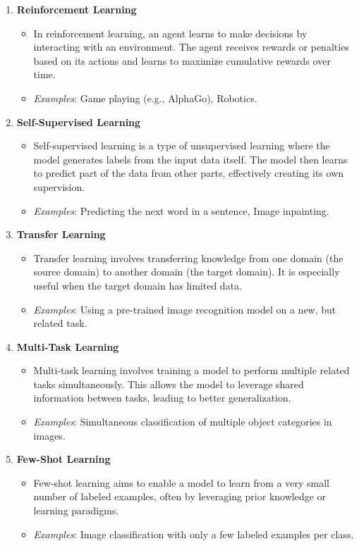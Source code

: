 \begin{enumerate}
    \item \textbf{Reinforcement Learning}
    \begin{itemize}
        \item In reinforcement learning, an agent learns to make decisions by interacting with an environment. The agent receives rewards or penalties based on its actions and learns to maximize cumulative rewards over time.
        \item \textit{Examples}: Game playing (e.g., AlphaGo), Robotics.
    \end{itemize}

    \item \textbf{Self-Supervised Learning}
    \begin{itemize}
        \item Self-supervised learning is a type of unsupervised learning where the model generates labels from the input data itself. The model then learns to predict part of the data from other parts, effectively creating its own supervision.
        \item \textit{Examples}: Predicting the next word in a sentence, Image inpainting.
    \end{itemize}

    \item \textbf{Transfer Learning}
    \begin{itemize}
        \item Transfer learning involves transferring knowledge from one domain (the source domain) to another domain (the target domain). It is especially useful when the target domain has limited data.
        \item \textit{Examples}: Using a pre-trained image recognition model on a new, but related task.
    \end{itemize}

    \item \textbf{Multi-Task Learning}
    \begin{itemize}
        \item Multi-task learning involves training a model to perform multiple related tasks simultaneously. This allows the model to leverage shared information between tasks, leading to better generalization.
        \item \textit{Examples}: Simultaneous classification of multiple object categories in images.
    \end{itemize}

    \item \textbf{Few-Shot Learning}
    \begin{itemize}
        \item Few-shot learning aims to enable a model to learn from a very small number of labeled examples, often by leveraging prior knowledge or learning paradigms.
        \item \textit{Examples}: Image classification with only a few labeled examples per class.
    \end{itemize}


\end{enumerate}
